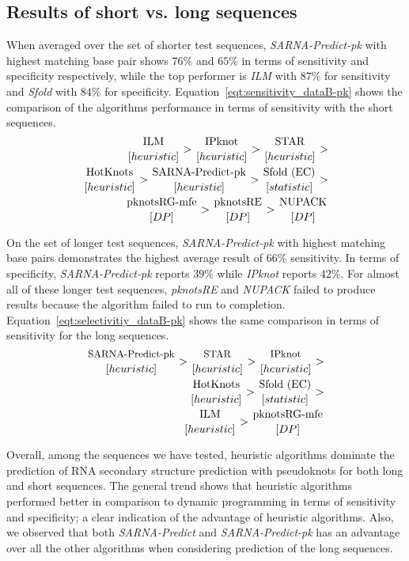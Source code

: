 \documentclass{doublecol-new}
\theoremstyle{TH}{
\newtheorem{lemma}{Lemma}
\newtheorem{theorem}[lemma]{Theorem}
\newtheorem{corrolary}[lemma]{Corrolary}
\newtheorem{conjecture}[lemma]{Conjecture}
\newtheorem{proposition}[lemma]{Proposition}
\newtheorem{claim}[lemma]{Claim}
\newtheorem{stheorem}[lemma]{Wrong Theorem}
\newtheorem{algorithm}{Algorithm}
}
\theoremstyle{THrm}{
\newtheorem{definition}{Definition}
\newtheorem{question}{Question}
\newtheorem{remark}{Remark}
\newtheorem{scheme}{Scheme}
}
\theoremstyle{THhit}{
\newtheorem{case}{Case}[section]
}
\begin{document}
\subsection{Results of short vs. long sequences}
When averaged over the set of shorter test sequences, {\em SARNA-Predict-pk}
with highest matching base pair shows $76\%$ and $65\%$  in terms of sensitivity
and specificity respectively, while the top performer is {\em ILM} with $87\%$ for
sensitivity and {\em Sfold} with $84\%$ for specificity.
Equation~\ref{eqt:sensitivity_dataB-pk} shows
the comparison of the algorithms performance in terms of sensitivity with the short sequences.
\begin{eqnarray}
\label{eqt:sensitivity_dataB-pk}
{\mbox{ILM} \atop [heuristic]} >  {\mbox{IPknot} \atop [heuristic]} > {\mbox{STAR} \atop [heuristic]} >  \\ \nonumber
{\mbox{HotKnots} \atop [heuristic]} >  
{\mbox{SARNA-Predict-pk} \atop [heuristic]} >  {\mbox{Sfold (EC)} \atop [statistic]} > \\ \nonumber
{\mbox{pknotsRG-mfe} \atop[DP]} > 
{\mbox{pknotsRE}  \atop[DP]} > {\mbox{NUPACK}  \atop[DP]} 
\end{eqnarray}

On the set of longer test sequences, {\em SARNA-Predict-pk}
with highest matching base pairs demonstrates the highest average result of $66\%$ sensitivity. 
In terms of specificity,  {\em SARNA-Predict-pk} reports $39\%$ while {\em IPknot} reports $42\%$.
For almost all of these longer test sequences, {\em pknotsRE} and {\em NUPACK} failed
to produce results because the algorithm failed to run to completion.
Equation~\ref{eqt:selectivitiy_dataB-pk} shows the same comparison in terms of sensitivity for the long sequences.
\begin{eqnarray}
\label{eqt:selectivitiy_dataB-pk}
\small
{\mbox{SARNA-Predict-pk} \atop [heuristic]} > 
{\mbox{STAR} \atop [heuristic]} >  
{\mbox{IPknot} \atop [heuristic]} >  \\ \nonumber
{\mbox{HotKnots} \atop [heuristic]} >  
{\mbox{Sfold (EC)} \atop [statistic]} > \\ \nonumber
{\mbox{ILM} \atop [heuristic]} > 
{\mbox{pknotsRG-mfe}  \atop[DP]} \nonumber
\end{eqnarray}

Overall, among the sequences we have tested, heuristic algorithms
dominate the prediction of RNA secondary structure prediction with
pseudoknots for both long and short sequences. The general trend
shows that heuristic algorithms performed better in comparison to
dynamic programming in terms of sensitivity and specificity; a clear
indication of the advantage of heuristic algorithms. Also, we
observed that both {\em SARNA-Predict} and {\em SARNA-Predict-pk}
has an advantage over all the other algorithms when considering
prediction of the long sequences.
\end{document}
